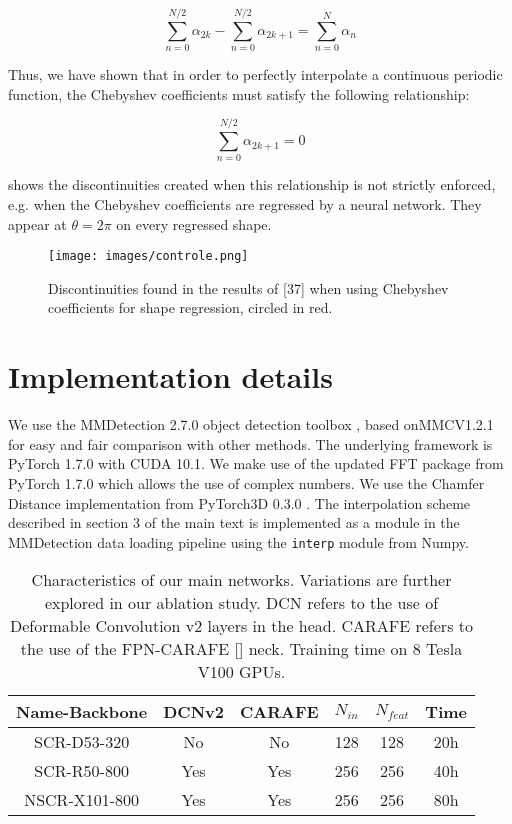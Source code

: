 \documentclass[10pt,twocolumn]{article}
\begin{document}
\begin{equation}
    \sum_{n=0}^{N/2} \alpha_{2k} - \sum_{n=0}^{N/2} \alpha_{2k+1} = \sum_{n=0}^{N} \alpha_{n} 
\end{equation}

Thus, we have shown that in order to perfectly interpolate
a continuous periodic function, the Chebyshev coefficients
must satisfy the following relationship:

\begin{equation}
    \sum_{n=0}^{N/2} \alpha_{2k+1} = 0
\end{equation}

 shows the discontinuities created when this relationship
is not strictly enforced, e.g. when the Chebyshev
coefficients are regressed by a neural network. They appear
at $\theta = 2 \pi$ on every regressed shape.

\begin{figure}[H]
    \centering
    \texttt{[image: images/controle.png]}
    \caption{Discontinuities found in the results of [37] when using
Chebyshev coefficients for shape regression, circled in red.}
    \label{fig:fig7}
\end{figure}


\section{Implementation details}

We use the MMDetection 2.7.0 object detection toolbox
\cite{chen2019mmdetection}, based onMMCV1.2.1 for easy and fair comparison
with other methods. The underlying framework is PyTorch
1.7.0 with CUDA 10.1. We make use of the updated FFT
package from PyTorch 1.7.0 which allows the use of complex
numbers. We use the Chamfer Distance implementation
from PyTorch3D 0.3.0 \cite{ravi2020accelerating}. The interpolation scheme
described in section 3 of the main text is implemented as a
module in the MMDetection data loading pipeline using the
\texttt{interp} module from Numpy.

\begin{table}[H]
    \centering
    \begin{tabular}{c|c|c|c|c|c}
         Name-Backbone & DCNv2 & CARAFE & $N_{in}$  & $N_{feat}$ & Time \\
         \hline
         SCR-D53-320 & No & No & 128 & 128 & 20h \\
         SCR-R50-800 & Yes & Yes & 256 & 256 & 40h \\
         NSCR-X101-800 &  Yes &  Yes &  256 &  256 & 80h \\
    \end{tabular}
    \caption{Characteristics of our main networks. Variations are further
explored in our ablation study. DCN refers to the use of Deformable
Convolution v2 \cite{zhu2019deformable} layers in the head. CARAFE refers
to the use of the FPN-CARAFE [] neck. Training time on 8
Tesla V100 GPUs.}
    \label{tab:tabl}
\end{table}
\end{document}
